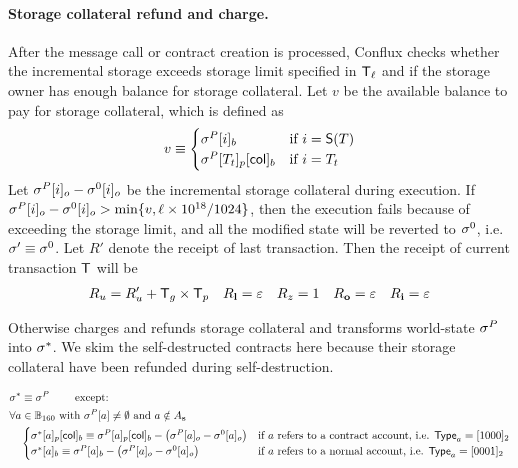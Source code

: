 
\paragraph{Storage collateral refund and charge.}

After the message call or contract creation is processed, Conflux checks whether the incremental storage exceeds storage limit specified in $\textsf{T}_\ell$ and if the storage owner has enough balance for storage collateral. 
Let $v$ be the available balance to pay for storage collateral, which is defined as 
\begin{align}
	v \equiv \begin{cases}
		\mathbf{\sigma}^{P}[i]_b & \mbox{if $i=\mathsf{S}{\left({T} \right)}$} \\
		\mathbf{\sigma}^{P}[T_t]_p[{\sf col}]_b &  \mbox{if $i=T_t$}
	\end{cases}
\end{align}
%
Let $\mathbf{\sigma}^{P}[i]_o-\mathbf{\sigma}^0[i]_o$ be the incremental storage collateral during execution.
If $\mathbf{\sigma}^{P}[i]_o-\mathbf{\sigma}^0[i]_o>\min\{v,\ell\times 10^{18}/1024\}$, then the execution fails because of exceeding the storage limit, 
and all the modified state will be reverted to $\mathbf{\sigma}^0$, 
i.e. $\mathbf{\sigma}'\equiv\mathbf{\sigma}^0$. 
Let $R'$ denote the receipt of last transaction.
Then the receipt of current transaction $\textsf{T}$ will be 
\begin{align}
	R_u=R'_u+\textsf{T}_g\times\textsf{T}_p && R_{\bf l}=\mathbb{\varepsilon} && R_z=1 && R_{\bf o}=\mathbb{\varepsilon} && R_{\bf i}=\mathbb{\varepsilon}
\end{align}

Otherwise \name charges and refunds storage collateral and transforms world-state $\mathbf{\sigma}^P$ into $\mathbf{\sigma}^*$. 
We skim the self-destructed contracts here because their storage collateral have been refunded during self-destruction. 

\begin{align}
	&\mathbf{\sigma}^*  \equiv \mathbf{\sigma}^{P} \qquad \mbox{  except:}\\
	&\forall a \in \mathbb{B}_{160} \text{ with } \mathbf{\sigma}^{P}[a]\neq\emptyset\text{ and }a\notin A_{\bf s} \\
	&\quad \begin{cases}
	\mathbf{\sigma}^*[a]_p[{\sf col}]_b \equiv \mathbf{\sigma}^{P}[a]_p[{\sf col}]_b - \left(\mathbf{\sigma}^{P}[a]_o-\mathbf{\sigma}^0[a]_o\right) & \mbox{if $a$ refers to a contract account, i.e. $\mathsf{Type}_{a}=[1000]_2$} \\
	\mathbf{\sigma}^*[a]_b \equiv \mathbf{\sigma}^{P}[a]_b - \left(\mathbf{\sigma}^{P}[a]_o-\mathbf{\sigma}^0[a]_o\right) & \mbox{if $a$ refers to a normal account, i.e. $\mathsf{Type}_{a}= [0001]_2$}
	\end{cases}
\end{align}

